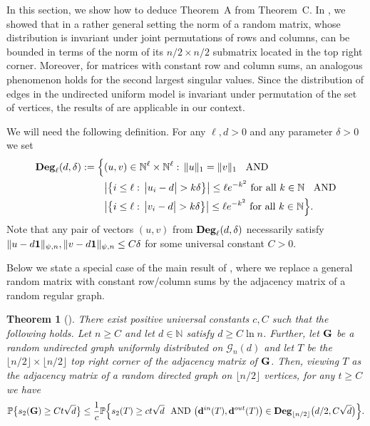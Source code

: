 \documentclass[12pt]{article}
\newtheorem{theorem}{Theorem}[section]
\theoremstyle{definition}
\theoremstyle{plain}
\newcommand{\degreeset}{{\rm \bf Deg}}
\newcommand{\N}{\mathbb{N}}
\def\rangr{{\bf{}G}}
\def\vofones{{\bf{}1}}
\def\Prob{{\mathbb P}}
\def\InDeg{{\bf d}^{in}}
\def\OutDeg{{\bf d}^{out}}
\def\UGraphSet{{\mathcal G}_{n}}
\begin{document}
In this section, we show how to deduce Theorem~A from Theorem~C.
In \cite{TY_short}, we showed that in a rather general setting
the norm of a random matrix, whose distribution is invariant under joint permutations of rows and columns, 
can be bounded in terms of the norm of its $n/2\times n/2$ submatrix located in the top right corner.
Moreover, for matrices with constant row and column sums, an analogous phenomenon
holds for the second largest singular values. 
Since the distribution of edges in the undirected uniform model is invariant under permutation of the set of vertices,
the results of \cite{TY_short} are applicable in our context. 

We will need the following definition. For any $\ell,d>0$ and any parameter $\delta>0$ we set
\begin{align*}
\degreeset_\ell(d,\delta):=\Big\{&(u,v)\in \N^\ell\times\N^\ell:\, \Vert u\Vert_1=\Vert v\Vert_1\;\;\mbox{ AND }\\
&\big|\big\{i\leq \ell:\,\big|u_i-d\big|> k\delta\big\}\big|
\leq \ell e^{-k^2}\mbox{ for all }k\in\N\;\;\mbox{ AND}\\
&\big|\big\{i\leq \ell:\,\big|v_i-d\big|> k\delta\big\}\big|
\leq \ell e^{-k^2}\mbox{ for all }k\in\N\Big\}.
\end{align*}
Note that any pair of vectors $(u,v)$ from $\degreeset_\ell(d,\delta)$
necessarily satisfy $\|u-d\vofones\|_{\psi,n},\|v-d\vofones\|_{\psi,n}\leq C\delta$
for some universal constant $C>0$.

Below we state a special case of the main result of \cite{TY_short}, where we replace a general random matrix 
with constant row/column sums by the adjacency matrix of a random regular graph.

\begin{theorem}[\cite{TY_short}]\label{th: main2}
There exist positive universal constants $c,C$ such that the following holds. 
Let $n\geq C$ and let $d\in\N$ satisfy $d\geq C\ln n$.
Further, let $\rangr$ be a random undirected graph uniformly distributed on $\UGraphSet(d)$ and
let $T$ be the $\lfloor n/2\rfloor\times\lfloor n/2\rfloor$ top right corner of the adjacency matrix of $\rangr$. 
Then, viewing $T$ as the adjacency matrix of a random directed graph on $\lfloor n/2\rfloor$ vertices, for any $t\geq C$ we have 
\begin{align*}
\Prob\big\{s_2(\rangr)\geq Ct\sqrt{d}\big\}\leq \frac{1}{c}\Prob\Big\{ s_2(T)\geq ct\sqrt{d} \mbox{ \ AND }
\big(\InDeg(T),\OutDeg(T)\big)\in \degreeset_{\lfloor n/2\rfloor}\big(d/2,C\sqrt{d}\big)\Big\}.
\end{align*}
\end{theorem}
\end{document}
